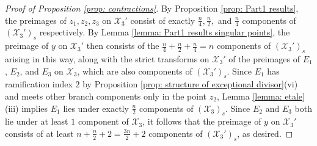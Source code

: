 \documentclass[12pt]{amsart}
\numberwithin{equation}{section}
\theoremstyle{definition}
\newcommand{\X}{\mathcal{X}}
\newcommand{\Y}{\mathcal{Y}}
\newcommand{\tx}[1]{\text{#1}}
\begin{document}
\begin{proof}[Proof of Proposition \ref{prop: contractions}]
    By Proposition \ref{prop: Part1 results}, the preimages of $z_1,z_2,z_3$ on $\X_3'$ consist of exactly $\frac{n}{4},\frac{n}{2},$ and $\frac{n}{4}$ components of $(\X_3')_s$ respectively. %
    By Lemma \ref{lemma: Part1 results singular points}, the preimage of $y$ on $\X_3'$ then consists of the $\frac{n}{4}+\frac{n}{2}+\frac{n}{4}=n$ components of $(\X_3')_s$ arising in this way, along with the strict transforms on $\X_3'$ of the preimages of $E_1$, $E_2$, and $E_3$ on $\X_3$, which are also components of $(\X_3')_s$. Since $E_1$ has ramification index $2$ by Proposition \ref{prop: structure of exceptional divisor}(vi) and meets other branch components only in the point $z_2$, Lemma \ref{lemma: etale}(iii) implies $E_1$ lies under exactly $\frac{n}{2}$ components of $(\X_3)_s$. Since $E_2$ and $E_3$ both lie under at least $1$ component of $\X_3$, it follows that the preimage of $y$ on $\X_3'$ consists of at least $n+\frac{n}{2}+2=\frac{3n}{2}+2$ components of $(\X_3')_s$, as desired.
    



\end{proof}
\end{document}
